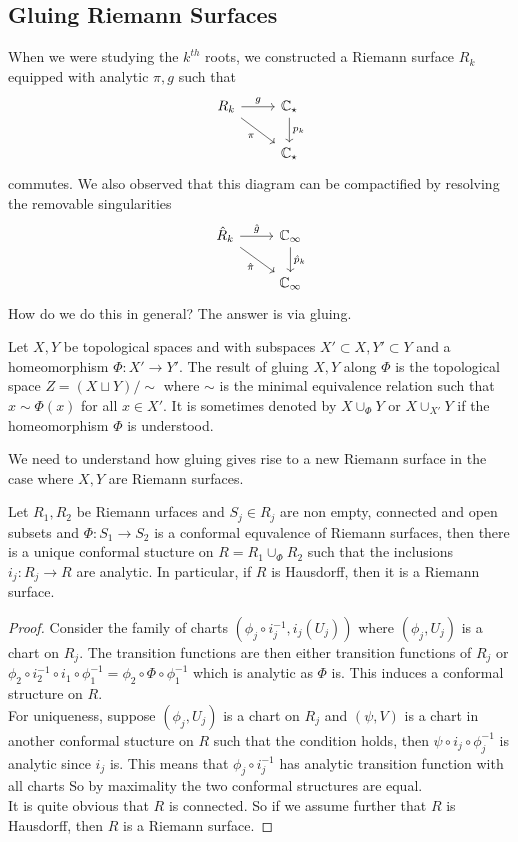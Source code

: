 \subsection{Gluing Riemann Surfaces}
When we were studying the $k^{th}$ roots, we constructed a Riemann surface $R_k$ equipped with analytic $\pi,g$ such that
\[
    \begin{tikzcd}
        R_k\arrow[swap]{dr}{\pi}\arrow{r}{g}&\mathbb C_\star\arrow{d}{p_k}\\
        &\mathbb C_\star
    \end{tikzcd}
\]
commutes.
We also observed that this diagram can be compactified by resolving the removable singularities
\[
    \begin{tikzcd}
        \hat{R}_k\arrow[swap]{dr}{\hat\pi}\arrow{r}{\hat{g}}&\mathbb C_\infty\arrow{d}{\hat{p}_k}\\
        &\mathbb C_\infty
    \end{tikzcd}
\]
How do we do this in general?
The answer is via gluing.
\begin{definition}
    Let $X,Y$ be topological spaces and with subspaces $X'\subset X,Y'\subset Y$ and a homeomorphism $\Phi:X'\to Y'$.
    The result of gluing $X,Y$ along $\Phi$ is the topological space $Z=(X\sqcup Y)/\sim$ where $\sim$ is the minimal equivalence relation such that $x\sim\Phi(x)$ for all $x\in X'$.
    It is sometimes denoted by $X\cup_{\Phi}Y$ or $X\cup_{X'}Y$ if the homeomorphism $\Phi$ is understood.
\end{definition}
We need to understand how gluing gives rise to a new Riemann surface in the case where $X,Y$ are Riemann surfaces.
\begin{proposition}
    Let $R_1,R_2$ be Riemann urfaces and $S_j\in R_j$ are non empty, connected and open subsets and $\Phi:S_1\to S_2$ is a conformal equvalence of Riemann surfaces, then there is a unique conformal stucture on $R=R_1\cup_\Phi R_2$ such that the inclusions $i_j:R_j\to R$ are analytic.
    In particular, if $R$ is Hausdorff, then it is a Riemann surface.
\end{proposition}
\begin{proof}
    Consider the family of charts $(\phi_j\circ i_j^{-1},i_j(U_j))$ where $(\phi_j,U_j)$ is a chart on $R_j$.
    The transition functions are then either transition functions of $R_j$ or $\phi_2\circ i_2^{-1}\circ i_1\circ\phi_1^{-1}=\phi_2\circ\Phi\circ\phi_1^{-1}$ which is analytic as $\Phi$ is.
    This induces a conformal structure on $R$.\\
    For uniqueness, suppose $(\phi_j,U_j)$ is a chart on $R_j$ and $(\psi,V)$ is a chart in another conformal stucture on $R$ such that the condition holds, then $\psi\circ i_j\circ\phi_j^{-1}$ is analytic since $i_j$ is.
    This means that $\phi_j\circ i_j^{-1}$ has analytic transition function with all charts
    So by maximality the two conformal structures are equal.\\
    It is quite obvious that $R$ is connected.
    So if we assume further that $R$ is Hausdorff, then $R$ is a Riemann surface.
\end{proof}
